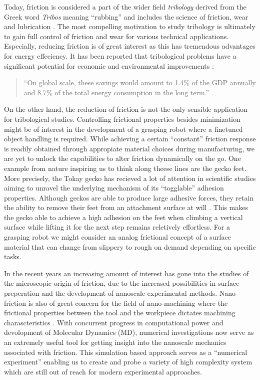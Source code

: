 Today, friction is considered a part of the wider field \textit{tribology}
derived from the Greek word \textit{Tribos} meaning ``rubbing'' and includes the
science of friction, wear and lubrication \cite{bhushan_2013}. The most
compelling motivation to study tribology is ultimately to gain full control of
friction and wear for various technical applications. Especially, reducing
friction is of great interest as this has tremendous advantages for energy
effeciency. It has been reported that tribological problems have a significant
potential for economic and environmental improvements
\cite{kim_nano-scale_2009}:
\begin{quote}
    ``On global scale, these savings would amount to 1.4\% of the GDP annually
    and 8.7\% of the total energy consumption in the long term.''
    \cite{holmberg_influence_2017}. 
\end{quote}
On the other hand, the reduction of friction is not the only sensible
application for tribological studies. Controlling frictional properties besides
minimization might be of interest in the development of a grasping robot where a
finetuned object handling is required. While achieving a certain ``constant''
friction response is readily obtained through appropiate material choices
during manufacturing, we are yet to unlock the capabilities to alter friction
dynamically on the go. One example from nature inspiring us to think along
theese lines are the gecko feet. More precisely, the Tokay gecko has recieved a
lot of attention in scientific studies aiming to unravel the underlying
mechanism of its ``togglable'' adhesion properties. Although geckos are able
to produce large adhesive forces, they retain the ability to remove their feet from an attachment surface at will \cite{Gekko}. This makes the gecko able to achieve a
high adhesion on the feet when climbing a vertical surface while lifting it
for the next step remains reletively effortless. For a grasping robot we might
consider an analog frictional concept of a surface material that can change from
slippery to rough on demand depending on specific tasks.

In the recent years an increasing amount of interest has gone into the studies
of the microscopic origin of friction, due to the increased possibilities in
surface preperation and the development of nanoscale experimental methods.
Nano-friction is also of great concern for the field of nano-machining where the
frictional properties between the tool and the workpiece dictates machining
charascteristics \cite{kim_nano-scale_2009}. With concurrent progress in
computational power and devolopment of Molecular Dynamics (\acrshort{MD}),
numerical investigations now serve as an extremely useful tool for getting
insight into the nanoscale mechanics associated with friction. This simulation
based approach serves as a ``numerical experiment'' enabling us to create and
probe a variety of high complexity system which are still out of reach for modern experimental approaches.

